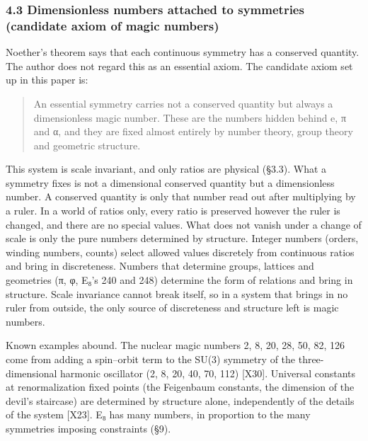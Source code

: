 \documentclass[
  a4paper,
]{article}
\begin{document}
\subsubsection{4.3 Dimensionless numbers attached to symmetries
(candidate axiom of magic
numbers)}\label{dimensionless-numbers-attached-to-symmetries-candidate-axiom-of-magic-numbers}

Noether's theorem says that each continuous symmetry has a conserved
quantity. The author does not regard this as an essential axiom. The
candidate axiom set up in this paper is:

\begin{quote}
An essential symmetry carries not a conserved quantity but always a
dimensionless magic number. These are the numbers hidden behind e, π and
α, and they are fixed almost entirely by number theory, group theory and
geometric structure.
\end{quote}

This system is scale invariant, and only ratios are physical (§3.3).
What a symmetry fixes is not a dimensional conserved quantity but a
dimensionless number. A conserved quantity is only that number read out
after multiplying by a ruler. In a world of ratios only, every ratio is
preserved however the ruler is changed, and there are no special values.
What does not vanish under a change of scale is only the pure numbers
determined by structure. Integer numbers (orders, winding numbers,
counts) select allowed values discretely from continuous ratios and
bring in discreteness. Numbers that determine groups, lattices and
geometries (π, φ, E₈'s 240 and 248) determine the form of relations and
bring in structure. Scale invariance cannot break itself, so in a system
that brings in no ruler from outside, the only source of discreteness
and structure left is magic numbers.

Known examples abound. The nuclear magic numbers 2, 8, 20, 28, 50, 82,
126 come from adding a spin--orbit term to the SU(3) symmetry of the
three-dimensional harmonic oscillator (2, 8, 20, 40, 70, 112) {[}X30{]}.
Universal constants at renormalization fixed points (the Feigenbaum
constants, the dimension of the devil's staircase) are determined by
structure alone, independently of the details of the system {[}X23{]}.
E₈ has many numbers, in proportion to the many symmetries imposing
constraints (§9).
\end{document}
